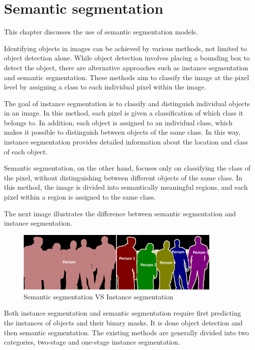 

\chapter{Semantic segmentation}
\label{chapter:unet}

\begin{introduction}
This chapter discusses the use of semantic segmentation models. 
\end{introduction}

Identifying objects in images can be achieved by various methods, not limited to object detection alone. While object detection involves placing a bounding box to detect the object, there are alternative approaches such as instance segmentation and semantic segmentation. These methods aim to classify the image at the pixel level by assigning a class to each individual pixel within the image.

The goal of instance segmentation is to classify and distinguish individual objects in an image. In this method, each pixel is given a classification of which class it belongs to. In addition, each object is assigned to an individual class, which makes it possible to distinguish between objects of the same class. In this way, instance segmentation provides detailed information about the location and class of each object.

Semantic segmentation, on the other hand, focuses only on classifying the class of the pixel, without distinguishing between different objects of the same class. In this method, the image is divided into semantically meaningful regions, and each pixel within a region is assigned to the same class.

The next image illustrates the difference between semantic segmentation and instance segmentation.

\begin{figure}[H]
\centering
\includegraphics[width=10cm]{images/semanticVSinstance.png}
\caption{Semantic segmentation VS Instance segmentation \cite{semanticvsinstance}}
\end{figure}


Both instance segmentation and semantic segmentation require first predicting the instances of objects and their binary masks. It is done object detection and then semantic segmentation. The existing methods are generally divided into two categories\cite{instayolo}, two-stage and one-stage instance segmentation.

